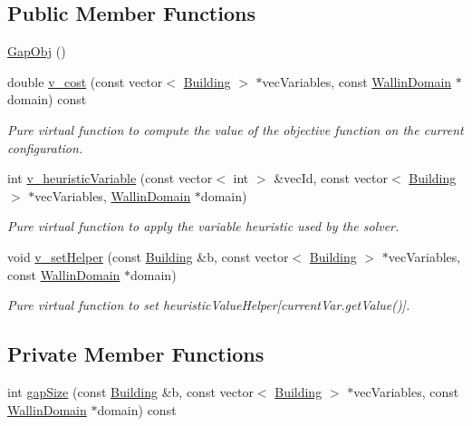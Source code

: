 \subsection*{Public Member Functions}
\begin{DoxyCompactItemize}
\item 
\hyperlink{classghost_1_1GapObj_a9b1139edad4eb82edab5e135e1257f72}{Gap\-Obj} ()
\item 
double \hyperlink{classghost_1_1GapObj_a0aff22c12b3a097df5a2314da5f41a04}{v\-\_\-cost} (const vector$<$ \hyperlink{classghost_1_1Building}{Building} $>$ $\ast$vec\-Variables, const \hyperlink{classghost_1_1WallinDomain}{Wallin\-Domain} $\ast$domain) const 
\begin{DoxyCompactList}\small\item\em Pure virtual function to compute the value of the objective function on the current configuration. \end{DoxyCompactList}\item 
int \hyperlink{classghost_1_1GapObj_a6cbd377f5f11676d918fcdf65f384cd3}{v\-\_\-heuristic\-Variable} (const vector$<$ int $>$ \&vec\-Id, const vector$<$ \hyperlink{classghost_1_1Building}{Building} $>$ $\ast$vec\-Variables, \hyperlink{classghost_1_1WallinDomain}{Wallin\-Domain} $\ast$domain)
\begin{DoxyCompactList}\small\item\em Pure virtual function to apply the variable heuristic used by the solver. \end{DoxyCompactList}\item 
void \hyperlink{classghost_1_1GapObj_afd55a0b02e6336d2a1f17e015488aa45}{v\-\_\-set\-Helper} (const \hyperlink{classghost_1_1Building}{Building} \&b, const vector$<$ \hyperlink{classghost_1_1Building}{Building} $>$ $\ast$vec\-Variables, const \hyperlink{classghost_1_1WallinDomain}{Wallin\-Domain} $\ast$domain)
\begin{DoxyCompactList}\small\item\em Pure virtual function to set heuristic\-Value\-Helper\mbox{[}current\-Var.\-get\-Value()\mbox{]}. \end{DoxyCompactList}\end{DoxyCompactItemize}
\subsection*{Private Member Functions}
\begin{DoxyCompactItemize}
\item 
int \hyperlink{classghost_1_1GapObj_abafdce010b63555042086d198f08f05d}{gap\-Size} (const \hyperlink{classghost_1_1Building}{Building} \&b, const vector$<$ \hyperlink{classghost_1_1Building}{Building} $>$ $\ast$vec\-Variables, const \hyperlink{classghost_1_1WallinDomain}{Wallin\-Domain} $\ast$domain) const 
\end{DoxyCompactItemize}
